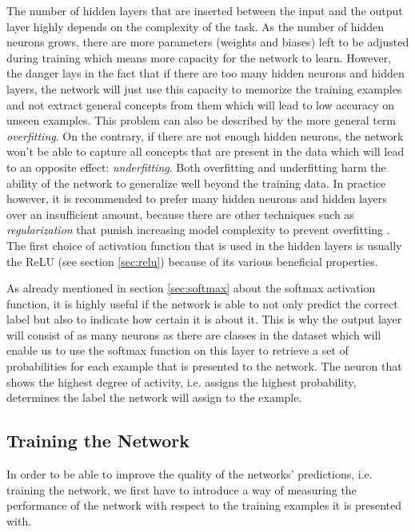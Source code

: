 The number of hidden layers that are inserted between the input and
the output layer highly depends on the complexity of the task. As the
number of hidden
neurons grows, there are more parameters (weights and biases) left to
be adjusted during
training which means more capacity for the network to learn. However, the
danger lays in the fact that if there are too many hidden neurons and
hidden layers, the network will just use this capacity to memorize the
training examples and not extract general concepts from them which
will lead to low accuracy on unseen examples. This problem can also be
described by the more general term \textit{overfitting}. On the
contrary, if there are not enough hidden neurons, the network won't be
able to capture all concepts that are present in the data which will
lead to an opposite effect: \textit{underfitting}. Both overfitting
and underfitting harm the ability of the network to generalize well
beyond the training data. In practice however, it is recommended to
prefer many hidden neurons and hidden layers over an
insufficient amount, because there are other techniques such as
\textit{regularization} that punish increasing model complexity to
prevent overfitting \cite{Bengio}. The first choice of activation
function that is used in the hidden layers is usually the ReLU (see
section \ref{sec:relu}) because of its various beneficial properties.

As already mentioned in section \ref{sec:softmax} about the softmax
activation function, it is highly useful if the
network is able to not only predict the correct label but also to
indicate how certain it is about it. This is why the output layer will
consist of as many neurons as there are classes in the dataset which
will enable us to use the softmax function on this layer to retrieve a
set of probabilities for each example that is presented to the
network. The neuron that shows the highest degree of activity,
i.e. assigns the highest probability, determines the label the network
will assign to the example.

\subsection{Training the Network}
\label{sec:training}
In order to be able to improve the quality of the networks'
predictions, i.e. training the network, we first have to introduce a
way of measuring the performance of the network with respect to the
training examples it is presented with.

